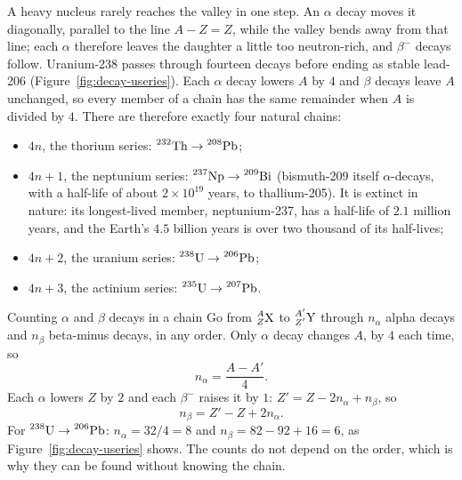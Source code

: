 A heavy nucleus rarely reaches the valley in one step. An $\alpha$ decay moves it diagonally, parallel to
the line $A-Z=Z$, while the valley bends away from that line; each $\alpha$ therefore leaves the daughter a
little too neutron-rich, and $\beta^-$ decays follow. Uranium-238 passes through fourteen decays before
ending as stable lead-206 (Figure~\ref{fig:decay-useries}). Each $\alpha$ decay lowers $A$ by $4$ and $\beta$
decays leave $A$ unchanged, so every member of a chain has the same remainder when $A$ is divided by $4$.
There are therefore exactly four natural chains:
\begin{itemize}
\item $4n$, the thorium series: $\prescript{232}{}{\mathrm{Th}}\to\prescript{208}{}{\mathrm{Pb}}$;
\item $4n+1$, the neptunium series: $\prescript{237}{}{\mathrm{Np}}\to\prescript{209}{}{\mathrm{Bi}}$ (bismuth-209 itself $\alpha$-decays, with a
      half-life of about $2\times10^{19}$ years, to thallium-205). It is extinct in nature: its
      longest-lived member, neptunium-237, has a half-life of $2.1$ million years, and the Earth's
      $4.5$ billion years is over two thousand of its half-lives;
\item $4n+2$, the uranium series: $\prescript{238}{}{\mathrm{U}}\to\prescript{206}{}{\mathrm{Pb}}$;
\item $4n+3$, the actinium series: $\prescript{235}{}{\mathrm{U}}\to\prescript{207}{}{\mathrm{Pb}}$.
\end{itemize}

\begin{figure}[htbp]
\centering
{}
\end{figure}

\begin{derivbox}{Counting $\alpha$ and $\beta$ decays in a chain}
Go from $\prescript{A}{Z}{\mathrm{X}}$ to $\prescript{A'}{Z'}{\mathrm{Y}}$ through $n_\alpha$ alpha decays and $n_\beta$ beta-minus
decays, in any order. Only $\alpha$ decay changes $A$, by $4$ each time, so
\[
n_\alpha=\frac{A-A'}{4}.
\]
Each $\alpha$ lowers $Z$ by $2$ and each $\beta^-$ raises it by $1$: $Z'=Z-2n_\alpha+n_\beta$, so
\[
n_\beta=Z'-Z+2n_\alpha.
\]
For $\prescript{238}{}{\mathrm{U}}\to\prescript{206}{}{\mathrm{Pb}}$: $n_\alpha=32/4=8$ and $n_\beta=82-92+16=6$, as
Figure~\ref{fig:decay-useries} shows. The counts do not depend on the order, which is why they can be found
without knowing the chain.
\end{derivbox}

